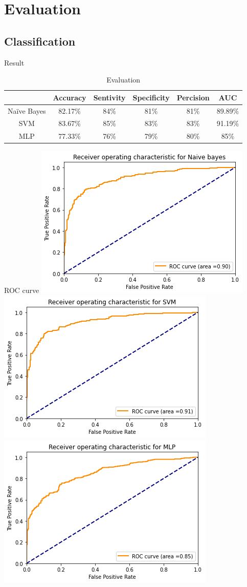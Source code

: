 \documentclass{beamer}
\begin{document}
\section{Evaluation}
\subsection{Classification}
\begin{frame}{Result}
    \begin{table}[]
        \centering
        \begin{tabular}{|c|c|c|c|c|c|}
        \hline
        &Accuracy&Sentivity&Specificity&Percision&AUC\\
        \hline
        Na\"ive Bayes&82.17\%&84\%&81\%&81\%&89.89\%\\
        \hline
        SVM&83.67\%&85\%&83\%&83\%&91.19\%\\
        \hline
        MLP&77.33\%&76\%&79\%&80\%&85\%\\
        \hline
        \end{tabular}
        \caption{Evaluation}
        \label{tab:my_label}
    \end{table}
\end{frame}

\begin{frame}{ROC curve}
\centering
\includegraphics[width=.4\linewidth]{Figures/nb_roc.png}\quad%
\includegraphics[width=.4\linewidth]{Figures/svm_roc.png}\quad%
\includegraphics[width=.4\linewidth]{Figures/mlp_roc.png}
\end{frame}
\end{document}
